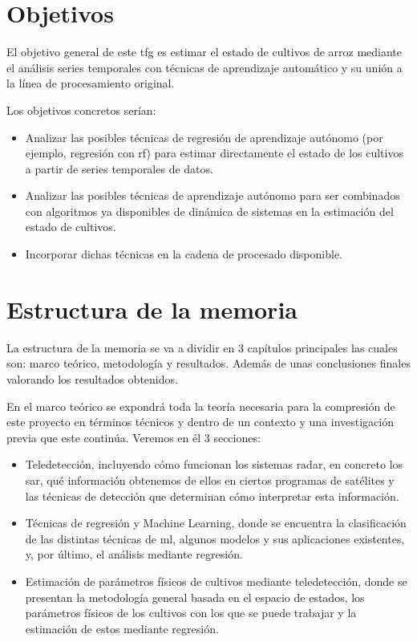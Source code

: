 \section{Objetivos}
El objetivo general de este \gls{tfg} es estimar el estado de cultivos de arroz mediante el análisis series temporales con técnicas de aprendizaje automático y su unión a la línea de procesamiento original.
\\
\par Los objetivos concretos serían: 
\begin{itemize}
	\item Analizar las posibles técnicas de regresión de aprendizaje autónomo (por ejemplo, regresión con \gls{rf}) para estimar directamente el estado de los cultivos a partir de series temporales de datos. 
	\item Analizar las posibles técnicas de aprendizaje autónomo para ser combinados con algoritmos ya disponibles de dinámica de sistemas en la estimación del estado de cultivos.
	\item Incorporar dichas técnicas en la cadena de procesado disponible.
\end{itemize}

\section{Estructura de la memoria}
\par La estructura de la memoria se va a dividir en 3 capítulos principales las cuales son: marco teórico, metodología y resultados. Además de unas conclusiones finales valorando los resultados obtenidos.
\\
\par En el marco teórico se expondrá toda la teoría necesaria para la compresión de este proyecto en términos técnicos y dentro de un contexto y una investigación previa que este continúa. Veremos en él 3 secciones:
\begin{itemize}
	\item Teledetección, incluyendo cómo funcionan los sistemas radar, en concreto los \gls{sar}, qué información obtenemos de ellos en ciertos programas de satélites y las técnicas de detección que determinan cómo interpretar esta información.
	\item Técnicas de regresión y Machine Learning, donde se encuentra la clasificación de las distintas técnicas de \gls{ml}, algunos modelos y sus aplicaciones existentes, y, por último, el análisis mediante regresión. 
	\item Estimación de parámetros físicos de cultivos mediante
teledetección, donde se presentan la metodología general basada en el espacio de estados, los parámetros físicos de los cultivos con los que se puede trabajar y la estimación de estos mediante regresión. 
\end{itemize}

